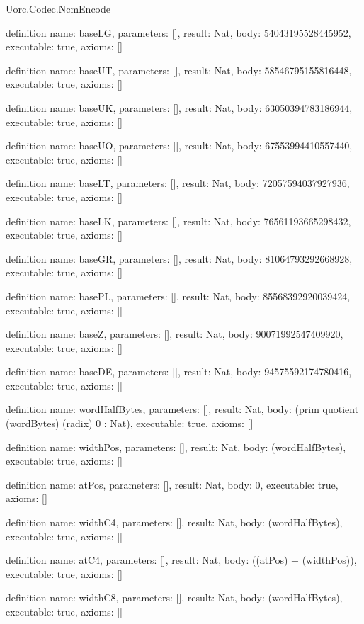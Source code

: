 \begin{lexlean}{Uorc.Codec.NcmEncode}
\begin{semanticmodule}
definition{
  name: baseLG,
  parameters: [],
  result: Nat,
  body: 54043195528445952,
  executable: true,
  axioms: []
}

definition{
  name: baseUT,
  parameters: [],
  result: Nat,
  body: 58546795155816448,
  executable: true,
  axioms: []
}

definition{
  name: baseUK,
  parameters: [],
  result: Nat,
  body: 63050394783186944,
  executable: true,
  axioms: []
}

definition{
  name: baseUO,
  parameters: [],
  result: Nat,
  body: 67553994410557440,
  executable: true,
  axioms: []
}

definition{
  name: baseLT,
  parameters: [],
  result: Nat,
  body: 72057594037927936,
  executable: true,
  axioms: []
}

definition{
  name: baseLK,
  parameters: [],
  result: Nat,
  body: 76561193665298432,
  executable: true,
  axioms: []
}

definition{
  name: baseGR,
  parameters: [],
  result: Nat,
  body: 81064793292668928,
  executable: true,
  axioms: []
}

definition{
  name: basePL,
  parameters: [],
  result: Nat,
  body: 85568392920039424,
  executable: true,
  axioms: []
}

definition{
  name: baseZ,
  parameters: [],
  result: Nat,
  body: 90071992547409920,
  executable: true,
  axioms: []
}

definition{
  name: baseDE,
  parameters: [],
  result: Nat,
  body: 94575592174780416,
  executable: true,
  axioms: []
}

definition{
  name: wordHalfBytes,
  parameters: [],
  result: Nat,
  body: (prim quotient (wordBytes) (radix) 0 : Nat),
  executable: true,
  axioms: []
}

definition{
  name: widthPos,
  parameters: [],
  result: Nat,
  body: (wordHalfBytes),
  executable: true,
  axioms: []
}

definition{
  name: atPos,
  parameters: [],
  result: Nat,
  body: 0,
  executable: true,
  axioms: []
}

definition{
  name: widthC4,
  parameters: [],
  result: Nat,
  body: (wordHalfBytes),
  executable: true,
  axioms: []
}

definition{
  name: atC4,
  parameters: [],
  result: Nat,
  body: ((atPos) + (widthPos)),
  executable: true,
  axioms: []
}

definition{
  name: widthC8,
  parameters: [],
  result: Nat,
  body: (wordHalfBytes),
  executable: true,
  axioms: []
}


\end{semanticmodule}
\end{lexlean}
